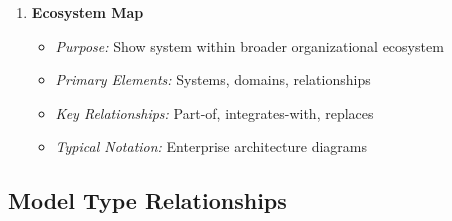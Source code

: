 \documentclass[11pt,letterpaper]{article}
\begin{document}
\begin{enumerate}[label=\textbf{MT\arabic*:}, leftmargin=2.5em]
    \item \textbf{Ecosystem Map}
    \begin{itemize}[nosep]
        \item \textit{Purpose:} Show system within broader organizational ecosystem
        \item \textit{Primary Elements:} Systems, domains, relationships
        \item \textit{Key Relationships:} Part-of, integrates-with, replaces
        \item \textit{Typical Notation:} Enterprise architecture diagrams
    \end{itemize}
\end{enumerate}

\subsection{Model Type Relationships}
\end{document}
